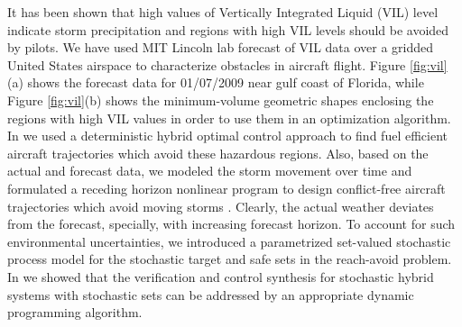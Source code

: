                  It has been shown that high values of Vertically
                 Integrated Liquid (VIL) level indicate storm
                 precipitation and regions with high VIL levels should
                 be avoided by pilots. We have used MIT Lincoln lab
                 forecast of VIL data over a gridded United States
                 airspace to characterize obstacles in aircraft
                 flight. Figure \ref{fig:vil}(a) shows the forecast
                 data for 01/07/2009 near gulf coast of Florida, while
                 Figure \ref{fig:vil}(b) shows the minimum-volume
                 geometric shapes enclosing the regions with high VIL
                 values in order to use them in an optimization
                 algorithm. In \cite{maryam2011ifac} we used a
                 deterministic hybrid optimal control approach to find
                 fuel efficient aircraft trajectories which avoid
                 these hazardous regions. Also, based on the actual
                 and forecast data, we modeled the storm movement over
                 time and formulated a receding horizon nonlinear
                 program to design conflict-free aircraft trajectories
                 which avoid moving storms
                 \cite{kamgarpour2010cdc}. Clearly, the actual weather
                 deviates from the forecast, specially, with
                 increasing forecast horizon. To account for such
                 environmental uncertainties, we introduced a
                 parametrized set-valued stochastic process model for
                 the stochastic target and safe sets in the
                 reach-avoid problem. In
                 \cite{summers2011stochasticset} we showed that the
                 verification and control synthesis for stochastic
                 hybrid systems with stochastic sets can be addressed
                 by an appropriate dynamic programming algorithm.

